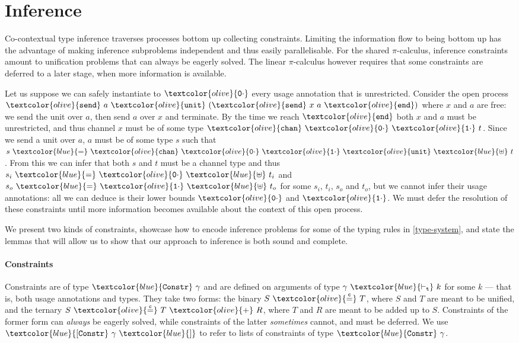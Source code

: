 \documentclass[sigplan,screen,review]{acmart}
\newcommand{\picalc}{$\pi$-calculus}
\newcommand{\constr}[1]{\textcolor{olive}{\mathtt{#1}}}
\newcommand{\type}[1]{\textcolor{blue}{\mathtt{#1}}}
\newcommand{\tkind}[2]{#1 ~\type{\vdash_t}~ #2}
\newcommand{\tSplit}[3]{#1~\type{=}~#2~\type{\uplus}~#3}
\newcommand{\tConstr}[1]{\type{Constr} ~ #1}
\newcommand{\tConstrs}[1]{\type{[Constr} ~ #1 ~ \type{]}}
\newcommand{\sunit}{\constr{unit}}
\newcommand{\send}{\constr{end}}
\newcommand{\ssend}{\constr{send}}
\newcommand{\tchan}{\constr{chan}}
\newcommand{\tunit}{\constr{unit}}
\newcommand{\tzero}{\constr{0\cdot}}
\newcommand{\tone}{\constr{1\cdot}}
\newcommand{\eqconstr}[2]{#1 ~ \constr{\stackrel{c}{=}} ~ #2}
\newcommand{\sumconstr}[3]{#1 ~ \constr{\stackrel{c}{=}} ~ #2 ~ \constr{+} ~ #3}
\begin{document}
     
\section{Inference}\label{inference}

Co-contextual type inference traverses processes bottom up collecting constraints.
Limiting the information flow to being bottom up has the advantage of making inference subproblems independent and thus easily parallelisable.
For the shared \picalc{}, inference constraints amount to unification problems that can always be eagerly solved.
The linear \picalc{} however requires that some constraints are deferred to a later stage, when more information is available.

Let us suppose we can safely instantiate to $\tzero$ every usage annotation that is unrestricted.
Consider the open process $\ssend~a~\sunit~(\ssend~x~a~\send)$ where $x$ and $a$ are free: we send the unit over $a$, then send $a$ over $x$ and terminate.
By the time we reach $\send$ both $x$ and $a$ must be unrestricted, and thus channel $x$ must be of some type $\tchan~\tzero~\tone~t$.
Since we send a unit over $a$, $a$ must be of some type $s$ such that $\tSplit{s}{\tchan~\tzero~\tone~\tunit}{t}$.
From this we can infer that both $s$ and $t$ must be a channel type and thus $\tSplit{s_i}{\tzero}{t_i}$ and $\tSplit{s_o}{\tone}{t_o}$ for some $s_i$, $t_i$, $s_o$ and $t_o$, but we cannot infer their usage annotations: all we can deduce is their lower bounds $\tzero$ and $\tone$.
We must defer the resolution of these constraints until more information becomes available about the context of this open process.

We present two kinds of constraints, showcase how to encode inference problems for some of the typing rules in \autoref{type-system}, and state the lemmas that will allow us to show that our approach to inference is both sound and complete.

\paragraph{Constraints}

Constraints are of type $\tConstr{\gamma}$ and are defined on arguments of type $\tkind{\gamma}{k}$ for some $k$ --- that is, both usage annotations and types.
They take two forms: the binary $\eqconstr{S}{T}$, where $S$ and $T$ are meant to be unified, and the ternary $\sumconstr{S}{T}{R}$, where $T$ and $R$ are meant to be added up to $S$.
Constraints of the former form can \emph{always} be eagerly solved, while constraints of the latter \emph{sometimes} cannot, and must be deferred.
We use $\tConstrs{\gamma}$ to refer to lists of constraints of type $\tConstr{\gamma}$.
\end{document}

